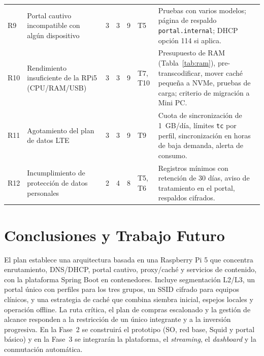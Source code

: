 \documentclass[conference]{IEEEtran}
\begin{document}
\begin{table}[t]
\begin{tabularx}{\textwidth}{l Y c c c l Y}
R9 & Portal cautivo incompatible con algún dispositivo & 3 & 3 & 9 & T5 & Pruebas con varios modelos; página de respaldo \texttt{portal.internal}; DHCP opción 114 si aplica. \\
R10 & Rendimiento insuficiente de la RPi5 (CPU/RAM/USB) & 3 & 3 & 9 & T7, T10 & Presupuesto de RAM (Tabla~\ref{tab:ram}), pre-transcodificar, mover caché pequeña a NVMe, pruebas de carga; criterio de migración a Mini PC. \\
R11 & Agotamiento del plan de datos LTE & 3 & 3 & 9 & T9 & Cuota de sincronización de 1~GB/día, límites \texttt{tc} por perfil, sincronización en horas de baja demanda, alerta de consumo. \\
R12 & Incumplimiento de protección de datos personales & 2 & 4 & 8 & T5, T6 & Registros mínimos con retención de 30 días, aviso de tratamiento en el portal, respaldos cifrados. \\
\bottomrule
\end{tabularx}
\end{table}

\section{Conclusiones y Trabajo Futuro}
El plan establece una arquitectura basada en una Raspberry Pi 5 que concentra enrutamiento, DNS/DHCP, portal cautivo, proxy/caché y servicios de contenido, con la plataforma Spring Boot en contenedores. Incluye segmentación L2/L3, un portal único con perfiles para los tres grupos, un SSID cifrado para equipos clínicos, y una estrategia de caché que combina siembra inicial, espejos locales y operación offline. La ruta crítica, el plan de compras escalonado y la gestión de alcance responden a la restricción de un único integrante y a la inversión progresiva. En la Fase~2 se construirá el prototipo (SO, red base, Squid y portal básico) y en la Fase~3 se integrarán la plataforma, el \textit{streaming}, el \textit{dashboard} y la conmutación automática.
\end{document}
